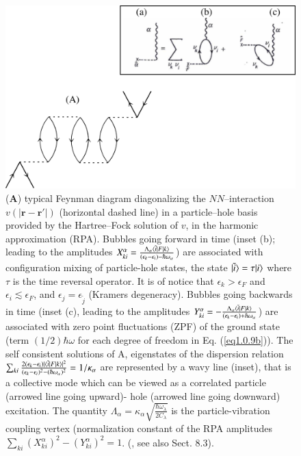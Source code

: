 \begin{figure}
	\centerline {
		\includegraphics*[width=12cm]{introduccion/figs/figpreface7}
	}
	\caption{(\textbf{A}) typical Feynman diagram diagonalizing the $NN$--interaction $v(|\mathbf r-\mathbf r'|)$ (horizontal dashed line) in a particle--hole basis provided by the Hartree--Fock solution of $v$, in the harmonic approximation (RPA). Bubbles going forward in time (inset (b); leading to the amplitudes $X^\alpha_{ki}=\frac{\Lambda_\alpha\langle {\tilde i|F|k} \rangle}{(\epsilon_k-\epsilon_i)-\hbar\omega_\alpha}$) are associated with configuration mixing of particle-hole states, the state $|{\tilde i} \rangle=\tau|{i} \rangle$ where $\tau$ is the time reversal operator. It is of notice that $\epsilon_k>\epsilon_F$ and $\epsilon_i\lesssim\epsilon_F$, and $\epsilon_j=\epsilon_{\widetilde j}$ (Kramers degeneracy). Bubbles going backwards in time (inset (c), leading to the amplitudes $Y^\alpha_{ki}=-\frac{\Lambda_\alpha\langle {\tilde i|F|k} \rangle}{(\epsilon_k-\epsilon_i)+\hbar\omega_\alpha}$) are associated with zero point  fluctuations (ZPF) of the ground state (term $(1/2)\hbar\omega$ for each degree of freedom in Eq. (\ref{eq1.0.9b})). The self consistent solutions of A, eigenstates of the dispersion relation $\sum_{ki}\frac{2(\epsilon_k-\epsilon_i)|\langle {\tilde i|F|k} \rangle|^2}{(\epsilon_k-\epsilon_i)^2-(\hbar\omega_\alpha)^2}=1/\kappa_\alpha$ are represented by a wavy line (inset), that is a collective mode which can be viewed as a correlated particle (arrowed line going upward)- hole (arrowed line going downward) excitation. The quantity $\Lambda_\alpha=\kappa_\alpha\sqrt{\frac{\hbar\omega_\lambda}{2C_\lambda}}$ is the particle-vibration coupling vertex (normalization constant of the RPA amplitudes $\sum_{ki}\left(X^\alpha_{ki}\right)^2-\left(Y^\alpha_{ki}\right)^2=1$. (\cite{Bohm:51,Bohm:53}, see also \cite{Brink:05} Sect. 8.3).}
	\label{fig1.0.7}
\end{figure}
